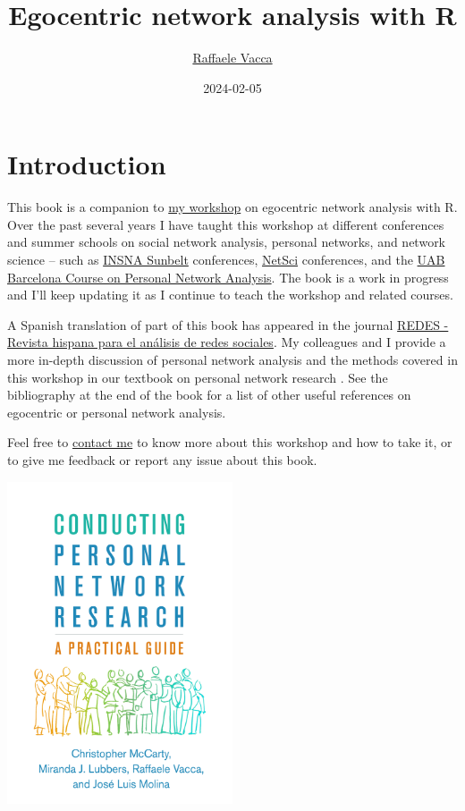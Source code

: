 \documentclass[
]{book}
\title{Egocentric network analysis with R}
\author{\href{http://www.raffaelevacca.com/}{Raffaele Vacca}}
\date{2024-02-05}
\begin{document}
\maketitle

{
\setcounter{tocdepth}{1}
\tableofcontents
}
\hypertarget{introduction}{%
\chapter{Introduction}\label{introduction}}

This book is a companion to \href{http://www.raffaelevacca.com/teaching/egocentric-r/}{my workshop} on egocentric network analysis with R. Over the past several years I have taught this workshop at different conferences and summer schools on social network analysis, personal networks, and network science -- such as \href{https://www.insna.org/}{INSNA Sunbelt} conferences, \href{https://netscisociety.net/home}{NetSci} conferences, and the \href{https://sway.office.com/1TpXMhGqKa7fTsAC}{UAB Barcelona Course on Personal Network Analysis}. The book is a work in progress and I'll keep updating it as I continue to teach the workshop and related courses.

A Spanish translation of part of this book has appeared in the journal \href{https://revistes.uab.cat/redes/article/view/v31-n2-vacca}{REDES - Revista hispana para el análisis de redes sociales}. My colleagues and I provide a more in-depth discussion of personal network analysis and the methods covered in this workshop in our textbook on personal network research \citep{mccarty_conducting_2019}. See the bibliography at the end of the book for a list of other useful references on egocentric or personal network analysis.

Feel free to \href{http://www.raffaelevacca.com/}{contact me} to know more about this workshop and how to take it, or to give me feedback or report any issue about this book.

\href{https://www.guilford.com/books/Conducting-Personal-Network-Research/McCarty-Lubbers-Vacca-Molina/9781462538386/authors}{\includegraphics[width=0.5\textwidth,height=\textheight]{./Figures/McCarty_et_al_2019_cover.jpg}}
\end{document}
